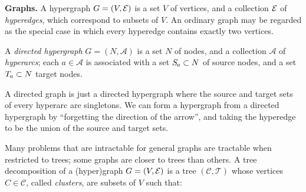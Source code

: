 \documentclass[twoside]{article}
\begin{document}


\textbf{Graphs.}
A hypergraph $G = (V, \mathcal E)$ is a set $V$ of vertices, and a collection $\mathcal E$ of \emph{hyperedges}, which correspond to subsets of $V$. 
An ordinary graph may be regarded as the special case in which every hyperedge contains exactly two vertices.

\begin{defn}
    A \emph{directed hypergraph} $G = (N, \mathcal A)$ is a set $N$ of nodes, and a collection $\mathcal A$ of \emph{hyperarcs}; each $a \in \mathcal A$ 
    is associated with a set $\Src a \subset N$ of source nodes, and a set $\Tgt a \subset N$ target nodes. 
\end{defn}
A directed graph is just a directed hypergraph where the source and target sets of every hyperarc are singletons. 
We can form a hypergraph from a directed hypergraph
by ``forgetting the direction of the arrow'', and taking the hyperedge
to be the union of the source and target sets. 

Many problems that are intractable for general graphs
are tractable when restricted to trees;
some graphs are closer to trees than others. 
%
A tree decomposition of a (hyper)graph $G = (V, \mathcal E)$ is a tree $(\mathcal C, \mathcal T)$ whose vertices $C \in \mathcal C$, called 
\emph{clusters}, are subsets of $V$ such that: 
\end{document}

